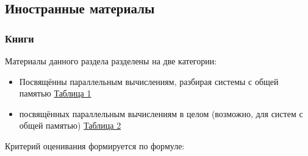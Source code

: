 \documentclass{article}
\begin{document}
\newpage
	\subsection{Иностранные материалы}
		\subsubsection{Книги}
			Материалы данного раздела разделены на две категории:
			\begin{itemize}
				\item Посвящённы параллельным вычислениям, разбирая системы с общей памятью \hyperlink{table1}{Таблица 1}
				\item посвящённых параллельным вычислениям в целом (возможно, для систем с общей памятью) \hyperlink{table2}{Таблица 2}
			\end{itemize}
			Критерий оценивания формируется по формуле:
			
\end{document}
